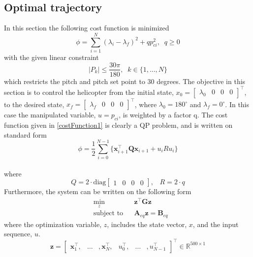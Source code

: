 \documentclass[11pt,a4paper,USenglish]{article} %
\begin{document}
\subsection{Optimal trajectory}
In this section the following cost function is minimized
\begin{equation}
\phi=\sum_{i=1}^{N}(\lambda_i-\lambda_f)^2+qp_{ci}^2,\;\; q\geq0
\label{costFunction1}
\end{equation}
with the given linear constraint
\begin{equation}
\mid{P_k}\mid\leq\frac{30\pi}{180},\;\;   k\in\{1,...,N\}
\end{equation}
which restricts the pitch and pitch set point to 30 degrees. The objective in this section is to control the helicopter from the initial state, $x_0=\begin{bmatrix}\lambda_0 & 0 & 0 & 0 \end{bmatrix}^\top$, to the desired state, $x_f=\begin{bmatrix}\lambda_f & 0 & 0 & 0 \end{bmatrix}^\top$, where $\lambda_0=180^{\circ}$ and $\lambda_f=0^{\circ}$. In this case the manipulated variable, $u=p_{ci}$, is weighted by a factor q. The cost function given in \eqref{costFunction1} is clearly a QP problem, and is written on standard form
\begin{equation}
\label{eq:QP1}
\phi = \frac{1}{2}\sum\limits_{i=0}^{N-1} \{ \mathbf{x}_{i+1}^\top \mathbf{Q} \mathbf{x}_{i+1} + u_i R u_i\}
\end{equation}\\
where
\begin{equation}
\label{eq:Q1}
Q = 2 \cdot \text{diag}
\begin{bmatrix}1 & 0 & 0 & 0\end{bmatrix} \text{,} \quad R = 2 \cdot q
\end{equation}
Furthermore, the system can be written on the following form
\begin{equation}
\begin{aligned}
	& \underset{z}{\text{min}}
	& & \mathbf{z}^\top \mathbf{G z} \\
	& \text{subject to}
	& & \mathbf{A}_{eq} \mathbf{z} = \mathbf{B}_{eq}
	\end{aligned}
\end{equation}
where the optimization variable, $z$, includes the state vector, $x$, and the input sequence, $u$. 
\begin{equation}
\mathbf{z} = \begin{bmatrix} \mathbf{x}_1^\top, & \ldots & ,\mathbf{x}_N^\top, & u_0^\top, & \ldots & ,u_{N-1}^\top \end{bmatrix}^\top \in  \mathbb{R}^{500 \times 1}
\end{equation}
\end{document}
